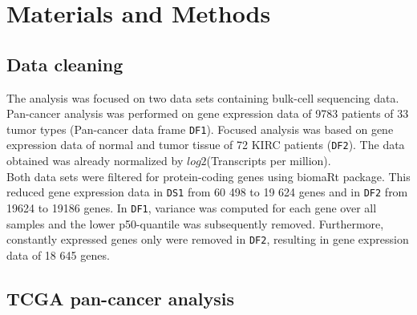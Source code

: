 \documentclass[
  parskip,
  oneside]{scrreprt}
\begin{document}
\hypertarget{materials-and-methods}{%
\chapter{Materials and Methods}\label{materials-and-methods}}

\hypertarget{data-cleaning}{%
\section{Data cleaning}\label{data-cleaning}}

The analysis was focused on two data sets containing bulk-cell
sequencing data. Pan-cancer analysis was performed on gene expression
data of 9783 patients of 33 tumor types (Pan-cancer data frame
\texttt{DF1}). Focused analysis was based on gene expression data of
normal and tumor tissue of 72 KIRC patients (\texttt{DF2}). The data
obtained was already normalized by \(log2\)(Transcripts per million).\\
Both data sets were filtered for protein-coding genes using biomaRt
package. This reduced gene expression data in \texttt{DS1} from 60 498
to 19 624 genes and in \texttt{DF2} from 19624 to 19186 genes. In
\texttt{DF1}, variance was computed for each gene over all samples and
the lower p50-quantile was subsequently removed. Furthermore, constantly
expressed genes only were removed in \texttt{DF2}, resulting in gene
expression data of 18 645 genes.

\hypertarget{tcga-pan-cancer-analysis}{%
\section{TCGA pan-cancer analysis}\label{tcga-pan-cancer-analysis}}
\end{document}

